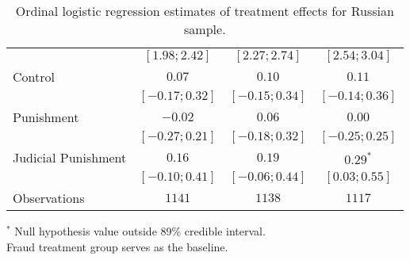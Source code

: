 \begin{table}[h]
\begin{center}
\begin{threeparttable}
\begin{tabular}{l c c c}
                    & $ [ 1.98;  2.42]$ & $ [ 2.27;  2.74]$ & $ [ 2.54;  3.04]$ \\
Control             & $0.07$            & $0.10$            & $0.11$            \\
                    & $ [-0.17;  0.32]$ & $ [-0.15;  0.34]$ & $ [-0.14;  0.36]$ \\
Punishment          & $-0.02$           & $0.06$            & $0.00$            \\
                    & $ [-0.27;  0.21]$ & $ [-0.18;  0.32]$ & $ [-0.25;  0.25]$ \\
Judicial Punishment & $0.16$            & $0.19$            & $0.29^{*}$        \\
                    & $ [-0.10;  0.41]$ & $ [-0.06;  0.44]$ & $ [ 0.03;  0.55]$ \\
\hline
Observations        & $1141$            & $1138$            & $1117$            \\
\hline
\end{tabular}
\begin{tablenotes}[flushleft]
\scriptsize{$^*$ Null hypothesis value outside 89\% credible interval.  \\
Fraud treatment group serves as the baseline.}
\end{tablenotes}
\end{threeparttable}
\caption{Ordinal logistic regression estimates of treatment effects for Russian sample.}
\label{table:coefficients}
\end{center}
\end{table}
